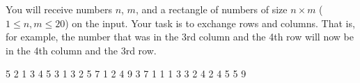 




You will receive numbers $n$, $m$, and a rectangle of numbers of size $n\times m$ ($1\leq n,m \leq 20$) on the input. Your task is to exchange rows and columns. That is, for example, the number that was in the 3rd column and the 4th row will now be in the 4th column and the 3rd row.

 5
2 1 3 4 5
3 1 3 2 5
7 1 2 4 9
 3 7
1 1 1
3 3 2
4 2 4
5 5 9
\koniec


